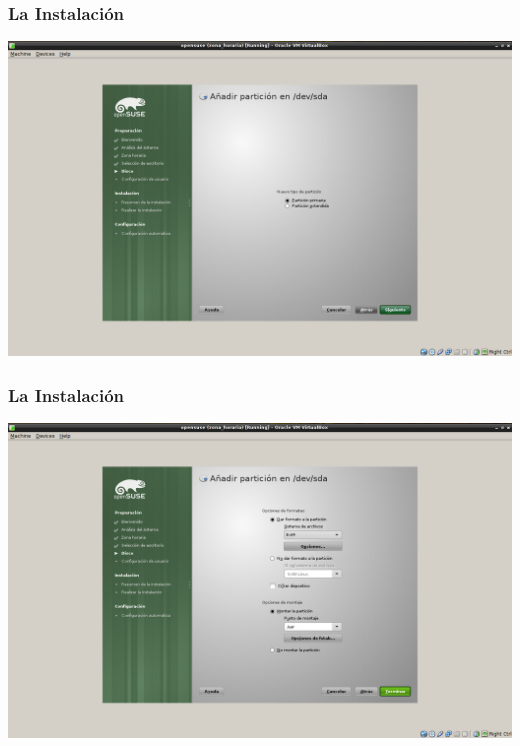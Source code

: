 \documentclass{beamer}
\begin{document}
\begin{frame}
\frametitle{La Instalaci\'on}
\includegraphics[height=0.8\textheight]{8.png} \hspace*{7.3cm}
\end{frame} 

\begin{frame}
\frametitle{La Instalaci\'on}
\includegraphics[height=0.8\textheight]{9.png} \hspace*{7.3cm}
\end{frame} 
\end{document}
